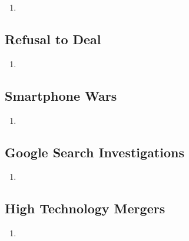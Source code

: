 \begin{enumerate}
    \item 
\end{enumerate}

\subsection{Refusal to Deal} %

\begin{enumerate}
    \item 
\end{enumerate}

\subsection{Smartphone Wars} %

\begin{enumerate}
    \item 
\end{enumerate}

\subsection{Google Search Investigations} %

\begin{enumerate}
    \item 
\end{enumerate}

\subsection{High Technology Mergers} %

\begin{enumerate}
    \item 
\end{enumerate}
